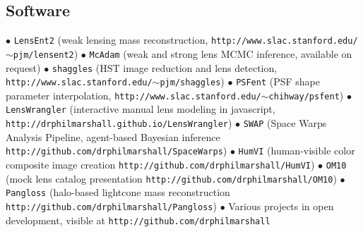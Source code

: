 \subsection*{Software}

$\bullet$
%
\texttt{LensEnt2} (weak lensing mass reconstruction,
\texttt{http://www.slac.stanford.edu/$\sim$pjm/lensent2})\newline
%
$\bullet$
%
\texttt{McAdam} (weak and strong lens MCMC inference, available on
request)\newline
%
$\bullet$
%
\texttt{shaggles} (HST image reduction and lens
detection, \texttt{http://www.slac.stanford.edu/$\sim$pjm/shaggles})\newline
%
$\bullet$
%
\texttt{PSFent} (PSF shape parameter interpolation,
\texttt{http://www.slac.stanford.edu/$\sim$chihway/psfent})\newline
%
$\bullet$
%
\texttt{LensWrangler} (interactive manual lens modeling in javascript,
\texttt{http://drphilmarshall.github.io/LensWrangler})\newline
%
$\bullet$
%
\texttt{SWAP} (Space Warps Analysis Pipeline, agent-based Bayesian inference
\texttt{http://github.com/drphilmarshall/SpaceWarps})\newline
%
$\bullet$
%
\texttt{HumVI} (human-visible color composite image creation
\texttt{http://github.com/drphilmarshall/HumVI})\newline
%
$\bullet$
%
\texttt{OM10} (mock lens catalog presentation
\texttt{http://github.com/drphilmarshall/OM10})\newline
%
$\bullet$
%
\texttt{Pangloss} (halo-based lightcone mass reconstruction
\texttt{http://github.com/drphilmarshall/Pangloss})\newline
%
$\bullet$
%
Various projects in open development, visible at
\texttt{http://github.com/drphilmarshall}
